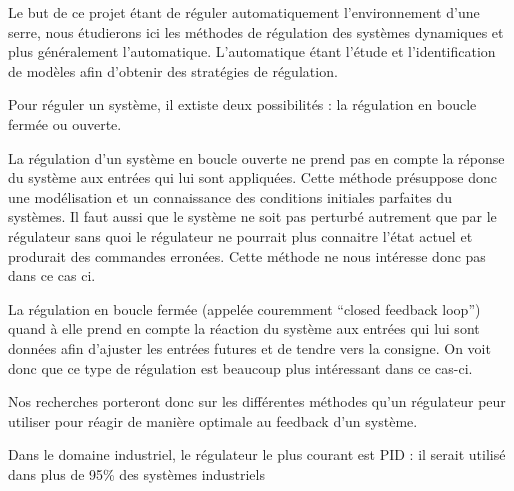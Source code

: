 
Le but de ce projet étant de réguler automatiquement l'environnement d'une serre, nous étudierons ici les méthodes de régulation des systèmes dynamiques et plus généralement l'automatique.
L'automatique étant l'étude et l'identification de modèles afin d'obtenir des stratégies de régulation.

Pour réguler un système, il extiste deux possibilités : la régulation en boucle fermée ou ouverte.

La régulation d'un système en boucle ouverte ne prend pas en compte la réponse du système aux entrées qui lui sont appliquées. Cette méthode présuppose donc une modélisation et un connaissance  des conditions initiales parfaites du systèmes. Il faut aussi que le système ne soit pas perturbé autrement que par le régulateur sans quoi le régulateur ne pourrait plus connaitre l'état actuel et produrait des commandes erronées. Cette méthode ne nous intéresse donc pas dans ce cas ci.

La régulation en boucle fermée (appelée couremment ``closed feedback loop'') quand à elle prend en compte la réaction du système aux entrées qui lui sont données afin d'ajuster les entrées futures et de tendre vers la consigne. On voit donc que ce type de régulation est beaucoup plus intéressant dans ce cas-ci.

Nos recherches porteront donc sur les différentes méthodes qu'un régulateur peur utiliser pour réagir de manière optimale au feedback d'un système.


Dans le domaine industriel, le régulateur le plus courant est PID : il serait utilisé dans plus de 95\% des systèmes industriels \cite{Kinnaert2013}
